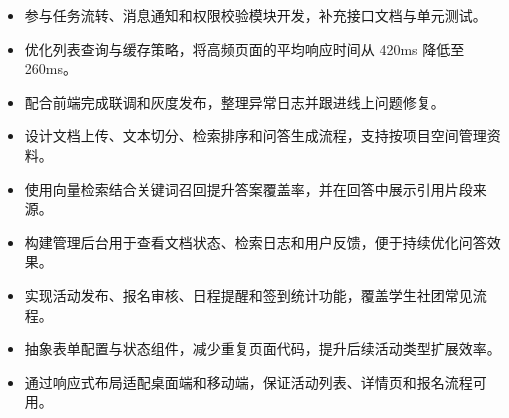 
\begin{itemize}
  \item 参与任务流转、消息通知和权限校验模块开发，补充接口文档与单元测试。
  \item 优化列表查询与缓存策略，将高频页面的平均响应时间从 420ms 降低至 260ms。
  \item 配合前端完成联调和灰度发布，整理异常日志并跟进线上问题修复。
\end{itemize}

\begin{itemize}
  \item 设计文档上传、文本切分、检索排序和问答生成流程，支持按项目空间管理资料。
  \item 使用向量检索结合关键词召回提升答案覆盖率，并在回答中展示引用片段来源。
  \item 构建管理后台用于查看文档状态、检索日志和用户反馈，便于持续优化问答效果。
\end{itemize}

\begin{itemize}
  \item 实现活动发布、报名审核、日程提醒和签到统计功能，覆盖学生社团常见流程。
  \item 抽象表单配置与状态组件，减少重复页面代码，提升后续活动类型扩展效率。
  \item 通过响应式布局适配桌面端和移动端，保证活动列表、详情页和报名流程可用。
\end{itemize}

\begin{onehalfspacing}
\end{onehalfspacing}

